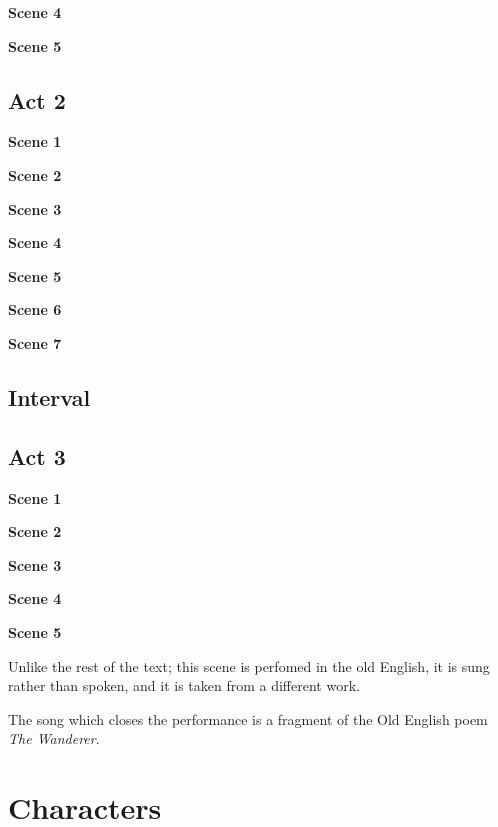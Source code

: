 \documentclass[a4paper]{article}
\begin{document}
{\centerline{\textbf{Scene 4}}

\centerline{\textbf{Scene 5}}

\subsection{Act 2}%

\centerline{\textbf{Scene 1}}

\centerline{\textbf{Scene 2}}

\centerline{\textbf{Scene 3}}

\centerline{\textbf{Scene 4}}

\centerline{\textbf{Scene 5}}

\centerline{\textbf{Scene 6}}

\centerline{\textbf{Scene 7}}

\subsection{Interval}%

\subsection{Act 3}%

\centerline{\textbf{Scene 1}}

\centerline{\textbf{Scene 2}}

\centerline{\textbf{Scene 3}}

\centerline{\textbf{Scene 4}}

\centerline{\textbf{Scene 5}}

Unlike the rest of the text; this scene is perfomed in the old English, it is sung 
rather than spoken, and it is taken from a different work.

The song which closes the performance is a fragment of the Old English poem \textit{The Wanderer}.

}

\section{Characters}
\end{document}
